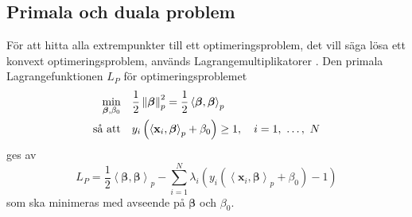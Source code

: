 \documentclass[a4paper, 12pt]{report}
\theoremstyle{definition}
\theoremstyle{remark}
\newcommand{\bfbeta}{{\boldsymbol{\beta}}}
\newcommand{\bfx}{\mathbf{x}}
\newcommand{\llangle}{\left\langle}
\newcommand{\rrangle}{\right\rangle}
\newcommand{\inner}[2]{\llangle #1, #2 \rrangle}
\begin{document}
\subsection{Primala och duala problem}

För att hitta alla extrempunkter till ett optimeringsproblem, det vill säga lösa ett konvext optimeringsproblem, används Lagrangemultiplikatorer \cite{Boyd}. %
Den primala Lagrangefunktionen $L_P$ för optimeringsproblemet
\begin{equation*}
\begin{aligned}
\operatornamewithlimits{min}_{\bfbeta, \beta_0} & & &\frac{1}{2}\left\|\bfbeta
\right\|_p^2=\frac{1}{2}\inner{\bfbeta}{\bfbeta}_p\\
\text{så att} & & &y_i\left(\inner{\bfx_i}{\bfbeta}_p+\beta_0\right)\geq 1,\quad i=1,~\dots,~N
\end{aligned}
\end{equation*}
ges av
\begin{equation}\label{eq:primallagrange}
L_P=\frac{1}{2}\inner{\bfbeta}{\bfbeta}_p - \sum_{i=1}^{N} \lambda_i\left(y_i \left(\inner{\bfx_i}{\bfbeta}_p + \beta_0\right)-1\right)
\end{equation}
som ska minimeras med avseende på $\bfbeta$ och $\beta_0$. %
\end{document}
